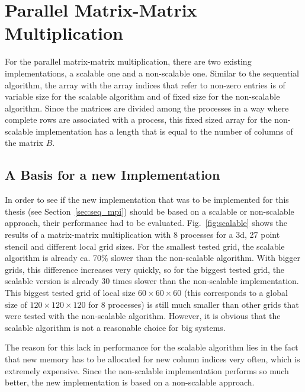 \section{Parallel Matrix-Matrix Multiplication}
For the parallel matrix-matrix multiplication, there are two existing implementations, a scalable one and a non-scalable one. Similar to the sequential algorithm, the array with the array indices that refer to non-zero entries is of variable size for the scalable algorithm and of fixed size for the non-scalable algorithm. Since the matrices are divided among the processes in a way where complete rows are  associated with a process, this fixed sized array for the non-scalable implementation has a length that is equal to the number of columns of the matrix $B$. 

\subsection{A Basis for a new Implementation}
In order to see if the new implementation that was to be implemented for this thesis (see Section~\ref{sec:seq_mpi}) should be based on a scalable or non-scalable approach, their performance had to be evaluated. Fig.~\ref{fig:scalable} shows the results of a matrix-matrix multiplication with 8 processes for a 3d, 27 point stencil and different local grid sizes. For the smallest tested grid, the scalable algorithm is already ca. 70\% slower than the non-scalable algorithm. With bigger grids, this difference increases very quickly, so for the biggest tested grid, the scalable version is already 30 times slower than the non-scalable implementation. This biggest tested grid of local size $60 \times 60 \times 60$ (this corresponds to a global size of $120\times 120 \times 120$ for 8 processes) is still much smaller than other grids that were tested with the non-scalable algorithm. However, it is obvious that the scalable algorithm is not a reasonable choice for big systems. 

The reason for this lack in performance for the scalable algorithm lies in the fact that new memory has to be allocated for new column indices very often, which is extremely expensive. Since the non-scalable implementation performs so much better, the new implementation is based on a non-scalable approach. 

